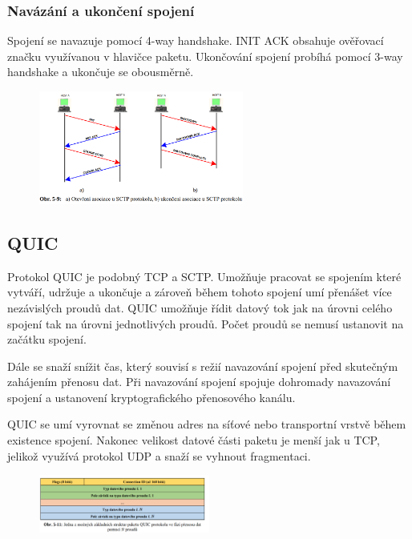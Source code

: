 \subsubsection{Navázání a ukončení spojení}

Spojení se navazuje pomocí 4-way handshake.
INIT ACK obsahuje ověřovací značku využívanou v hlavičce paketu.
Ukončování spojení probíhá pomocí 3-way handshake a ukončuje se obousměrně.

\begin{figure}[!h]
    \centering
    \includegraphics[width=0.6\textwidth]{obrazky/034.png}
\end{figure}

\subsection{QUIC}

Protokol QUIC je podobný TCP a SCTP.
Umožňuje pracovat se spojením které vytváří, udržuje a ukončuje a zároveň během tohoto spojení umí přenášet více nezávislých proudů dat.
QUIC umožňuje řídit datový tok jak na úrovni celého spojení tak na úrovni jednotlivých proudů.
Počet proudů se nemusí ustanovit na začátku spojení.

Dále se snaží snížit čas, který souvisí s režií navazování spojení před skutečným zahájením přenosu dat.
Při navazování spojení spojuje dohromady navazování spojení a ustanovení kryptografického přenosového kanálu.

QUIC se umí vyrovnat se změnou adres na síťové nebo transportní vrstvě během existence spojení.
Nakonec velikost datové části paketu je menší jak u TCP, jelikož využívá protokol UDP a snaží se vyhnout fragmentaci.

\begin{figure}[!h]
    \centering
    \includegraphics[width=0.5\textwidth]{obrazky/035.png}
\end{figure}


